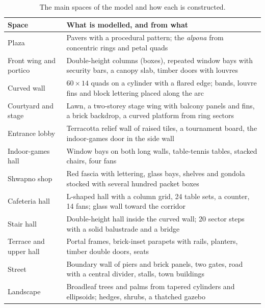 \documentclass[11pt,a4paper]{article}
\begin{document}
\begin{table}[H]
\centering\small
\begin{tabularx}{\textwidth}{@{}L{3.6cm}X@{}}
\toprule
Space & What is modelled, and from what \\
\midrule
Plaza & Pavers with a procedural pattern; the \emph{alpona} from concentric rings and petal quads \\
Front wing and portico & Double-height columns (boxes), repeated window bays with security bars, a canopy slab, timber doors with louvres \\
Curved wall & $60\times14$ quads on a cylinder with a flared edge; bands, louvre fins and block lettering placed along the arc \\
Courtyard and stage & Lawn, a two-storey stage wing with balcony panels and fins, a brick backdrop, a curved platform from ring sectors \\
Entrance lobby & Terracotta relief wall of raised tiles, a tournament board, the indoor-games door in the side wall \\
Indoor-games hall & Window bays on both long walls, table-tennis tables, stacked chairs, four fans \\
Shwapno shop & Red fascia with lettering, glass bays, shelves and gondola stocked with several hundred packet boxes \\
Cafeteria hall & L-shaped hall with a column grid, 24 table sets, a counter, 14 fans; glass wall toward the corridor \\
Stair hall & Double-height hall inside the curved wall; 20 sector steps with a solid balustrade and a bridge \\
Terrace and upper hall & Portal frames, brick-inset parapets with rails, planters, timber double doors, seats \\
Street & Boundary wall of piers and brick panels, two gates, road with a central divider, stalls, town buildings \\
Landscape & Broadleaf trees and palms from tapered cylinders and ellipsoids; hedges, shrubs, a thatched gazebo \\
\bottomrule
\end{tabularx}
\caption{The main spaces of the model and how each is constructed.}
\end{table}
\end{document}
